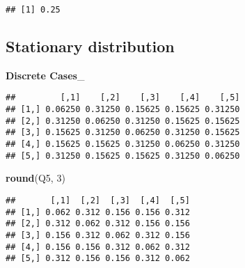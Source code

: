 \documentclass[]{book}
\newenvironment{Shaded}{\begin{snugshade}}{\end{snugshade}}
\newcommand{\CommentTok}[1]{\textcolor[rgb]{0.56,0.35,0.01}{\textit{#1}}}
\newcommand{\ControlFlowTok}[1]{\textcolor[rgb]{0.13,0.29,0.53}{\textbf{#1}}}
\newcommand{\DecValTok}[1]{\textcolor[rgb]{0.00,0.00,0.81}{#1}}
\newcommand{\KeywordTok}[1]{\textcolor[rgb]{0.13,0.29,0.53}{\textbf{#1}}}
\newcommand{\NormalTok}[1]{#1}
\newcommand{\OperatorTok}[1]{\textcolor[rgb]{0.81,0.36,0.00}{\textbf{#1}}}
\newcommand{\StringTok}[1]{\textcolor[rgb]{0.31,0.60,0.02}{#1}}
\begin{document}
\begin{verbatim}
## [1] 0.25
\end{verbatim}

\hypertarget{stationary-distribution}{%
\subsection{Stationary distribution}\label{stationary-distribution}}

\textbf{Discrete Cases}\_

\begin{Shaded}
\end{Shaded}

\begin{verbatim}
##         [,1]    [,2]    [,3]    [,4]    [,5]
## [1,] 0.06250 0.31250 0.15625 0.15625 0.31250
## [2,] 0.31250 0.06250 0.31250 0.15625 0.15625
## [3,] 0.15625 0.31250 0.06250 0.31250 0.15625
## [4,] 0.15625 0.15625 0.31250 0.06250 0.31250
## [5,] 0.31250 0.15625 0.15625 0.31250 0.06250
\end{verbatim}

\begin{Shaded}
\begin{Highlighting}[]
\KeywordTok{round}\NormalTok{(Q5, }\DecValTok{3}\NormalTok{)}
\end{Highlighting}
\end{Shaded}

\begin{verbatim}
##       [,1]  [,2]  [,3]  [,4]  [,5]
## [1,] 0.062 0.312 0.156 0.156 0.312
## [2,] 0.312 0.062 0.312 0.156 0.156
## [3,] 0.156 0.312 0.062 0.312 0.156
## [4,] 0.156 0.156 0.312 0.062 0.312
## [5,] 0.312 0.156 0.156 0.312 0.062
\end{verbatim}

\begin{Shaded}
\end{Shaded}
\end{document}
